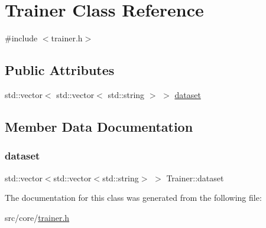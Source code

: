 \hypertarget{class_trainer}{}\section{Trainer Class Reference}
\label{class_trainer}


{\ttfamily \#include $<$trainer.\+h$>$}

\subsection*{Public Attributes}
\begin{DoxyCompactItemize}
\item 
std\+::vector$<$ std\+::vector$<$ std\+::string $>$ $>$ \mbox{\hyperlink{class_trainer_ac080f674e354a3bb22399a8e0553219d}{dataset}}
\end{DoxyCompactItemize}


\subsection{Member Data Documentation}
\mbox{\label{class_trainer_ac080f674e354a3bb22399a8e0553219d}} 
\subsubsection{\texorpdfstring{dataset}{dataset}}
{\footnotesize\ttfamily std\+::vector$<$std\+::vector$<$std\+::string$>$ $>$ Trainer\+::dataset}



The documentation for this class was generated from the following file\+:\begin{DoxyCompactItemize}
\item 
src/core/\mbox{\hyperlink{trainer_8h}{trainer.\+h}}\end{DoxyCompactItemize}
